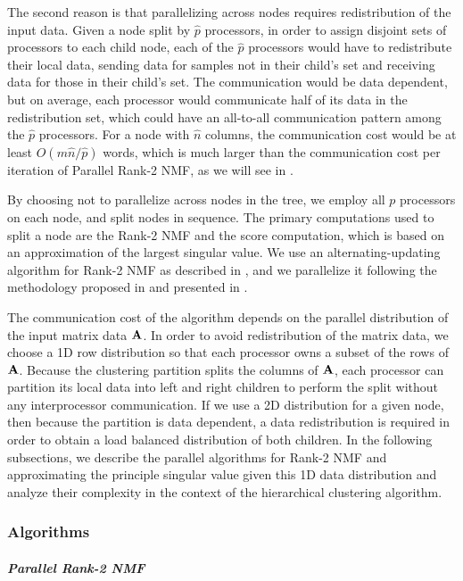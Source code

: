 \documentclass[conference,compsoc]{IEEEtran}
\begin{document}
The second reason is that parallelizing across nodes requires redistribution of the input data.
Given a node split by $\hat p$ processors, in order to assign disjoint sets of processors to each child node, each of the $\hat p$ processors would have to redistribute their local data, sending data for samples not in their child's set and receiving data for those in their child's set.
The communication would be data dependent, but on average, each processor would communicate half of its data in the redistribution set, which could have an all-to-all communication pattern among the $\hat p$ processors.
For a node with $\hat n$ columns, the communication cost would be at least $O(m\hat n/ \hat p)$ words, which is much larger than the communication cost per iteration of Parallel Rank-2 NMF, as we will see in .

By choosing not to parallelize across nodes in the tree, we employ all $p$ processors on each node, and split nodes in sequence.
The primary computations used to split a node are the Rank-2 NMF and the score computation, which is based on an approximation of the largest singular value.
We use an alternating-updating algorithm for Rank-2 NMF as described in , and we parallelize it following the methodology proposed in \cite{EH+19-TR} and presented in .

The communication cost of the algorithm depends on the parallel distribution of the input matrix data $\M{A}$.
In order to avoid redistribution of the matrix data, we choose a 1D row distribution so that each processor owns a subset of the rows of $\M{A}$.
Because the clustering partition splits the columns of $\M{A}$, each processor can partition its local data into left and right children to perform the split without any interprocessor communication.
If we use a 2D distribution for a given node, then because the partition is data dependent, a data redistribution is required in order to obtain a load balanced distribution of both children.
In the following subsections, we describe the parallel algorithms for Rank-2 NMF and approximating the principle singular value given this 1D data distribution and analyze their complexity in the context of the hierarchical clustering algorithm.

\subsubsection{Algorithms}

\paragraph{\emph{Parallel Rank-2 NMF}}
\end{document}
